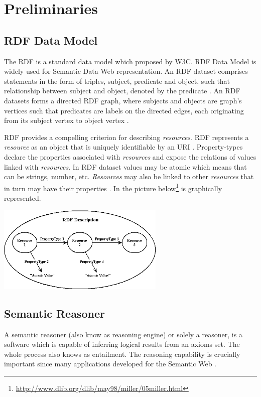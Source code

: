 \chapter{Preliminaries}\label{ch:preliminaries}
\section{RDF Data Model}
The \ac{RDF} is a standard data model \cite{rdf} which proposed by \ac{W3C}. RDF Data Model is widely used for Semantic Data Web representation. An RDF dataset comprises statements in the form of triples, subject, predicate and  object, such that relationship between subject and object, denoted by the predicate \cite{miller1998introduction}. An RDF datasets forms a directed RDF graph, where subjects and objects are graph's vertices such that predicates are labels on the directed edges, each originating from its subject vertex to object vertex \cite{lee2013scaling}.

RDF provides a compelling criterion for describing \textit{resources}. RDF represents a \textit{resource} as an object that is uniquely identifiable by an \ac{URI} \cite{uri}. Property-types declare the properties associated with \textit{resources} and expose the relations of values linked with \textit{resources}. In RDF dataset values may be atomic which means that can be strings, number, etc. \textit{Resources} may also be linked to other \textit{resources} that in turn may have their properties \cite{miller1998introduction}. In the picture below\footnote{\url{http://www.dlib.org/dlib/may98/miller/05miller.html}} is graphically represented.

\begin{center}
    \includegraphics[width=8cm]{gfx/chapters/preliminaries/rdfdesc.png}
\end{center}

\section{Semantic Reasoner}
A semantic reasoner (also know as reasoning engine) or solely a reasoner, is a software which is capable of inferring logical results from an axioms set. The whole process also knows as entailment. The reasoning capability is crucially important since many applications developed for the Semantic Web \cite{parsia2004pellet}.

